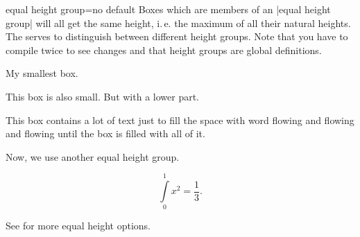 \clearpage
\begin{docTcbKey}[][doc updated=2014-11-07]{equal height group}{=}{no default}
  Boxes which are members of an |equal height group| will all get the
  same height, i.\,e. the maximum of all their natural heights. The
   serves to distinguish between different height groups.
  Note that you have to compile twice to see changes and
  that height groups are global definitions.


\begin{dispExample}

\begin{tcolorbox}[equal height group=A,adjusted title={One}]
  My smallest box.
\end{tcolorbox}%
\begin{tcolorbox}[equal height group=A,adjusted title={Two}]
  This box is also small.
  \tcblower
  But with a lower part.
\end{tcolorbox}%
\begin{tcolorbox}[equal height group=A,adjusted title={Three}]
  This box contains a lot of text just to fill the space
  with word flowing and flowing and flowing until the box
  is filled with all of it.
\end{tcolorbox}\linebreak
%
%
\begin{tcolorbox}[equal height group=B]
  Now, we use another equal height group.
\end{tcolorbox}%
\begin{tcolorbox}[equal height group=B]
  \begin{equation*}
    \int\limits_{0}^{1} x^2 = \frac13.
  \end{equation*}
\end{tcolorbox}
\end{dispExample}
\end{docTcbKey}

\medskip
\begin{marker}
See  for more equal height options.
\end{marker}

